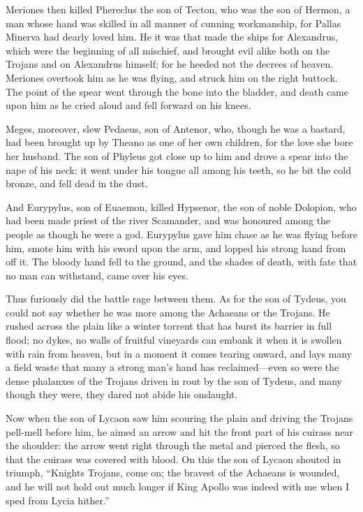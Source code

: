 Meriones then killed Phereclus the son of Tecton, who was the son of
Hermon, a man whose hand was skilled in all manner of cunning workmanship,
for Pallas Minerva had dearly loved him. He it was that made the ships for
Alexandrus, which were the beginning of all mischief, and brought evil
alike both on the Trojans and on Alexandrus himself; for he heeded not the
decrees of heaven. Meriones overtook him as he was flying, and struck him
on the right buttock. The point of the spear went through the bone into
the bladder, and death came upon him as he cried aloud and fell forward on
his knees.

Meges, moreover, slew Pedaeus, son of Antenor, who, though he was a
bastard, had been brought up by Theano as one of her own children, for the
love she bore her husband. The son of Phyleus got close up to him and
drove a spear into the nape of his neck: it went under his tongue all
among his teeth, so he bit the cold bronze, and fell dead in the dust.

And Eurypylus, son of Euaemon, killed Hypsenor, the son of noble Dolopion,
who had been made priest of the river Scamander, and was honoured among
the people as though he were a god. Eurypylus gave him chase as he was
flying before him, smote him with his sword upon the arm, and lopped his
strong hand from off it. The bloody hand fell to the ground, and the
shades of death, with fate that no man can withstand, came over his eyes.

Thus furiously did the battle rage between them. As for the son of Tydeus,
you could not say whether he was more among the Achaeans or the Trojans.
He rushed across the plain like a winter torrent that has burst its
barrier in full flood; no dykes, no walls of fruitful vineyards can embank
it when it is swollen with rain from heaven, but in a moment it comes
tearing onward, and lays many a field waste that many a strong man’s hand
has reclaimed—even so were the dense phalanxes of the Trojans driven
in rout by the son of Tydeus, and many though they were, they dared not
abide his onslaught.

Now when the son of Lycaon saw him scouring the plain and driving the
Trojans pell-mell before him, he aimed an arrow and hit the front part of
his cuirass near the shoulder: the arrow went right through the metal and
pierced the flesh, so that the cuirass was covered with blood. On this the
son of Lycaon shouted in triumph, “Knights Trojans, come on; the bravest
of the Achaeans is wounded, and he will not hold out much longer if King
Apollo was indeed with me when I sped from Lycia hither.”

